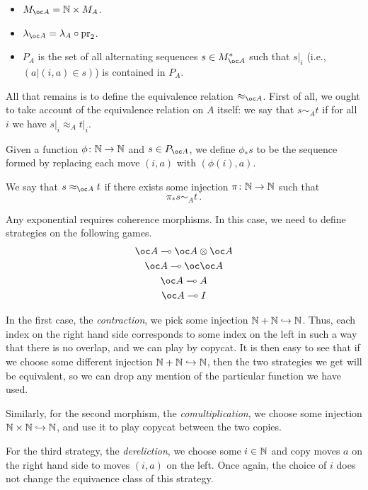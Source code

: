 \documentclass{article}
\begin{document}
\begin{itemize}
  \item $M_{\oc A} = \bN \times M_A$.
  \item $\lambda_{\oc A} = \lambda_A \circ \pr_2$.
  \item $P_A$ is the set of all alternating sequences $s\in M_{\oc A}^*$ such that $s\vert_i$ (i.e., $(a\vert (i,a)\in s)$) is contained in $P_A$.
\end{itemize}

All that remains is to define the equivalence relation $\approx_{\oc A}$.  
First of all, we ought to take account of the equivalence relation on $A$ itself: we say that $s\sim_At$ if for all $i$ we have $s\vert_i\approx_A t\vert_i$.

Given a function $\phi\colon \mathbb{N} \to \mathbb{N}$ and $s\in P_{\oc A}$, we define $\phi_*s$ to be the sequence formed by replacing each move $(i,a)$ with $(\phi(i),a)$.

We say that $s\approx_{\oc A}t$ if there exists some injection $\pi\colon \mathbb{N}\to\mathbb{N}$ such that
\[
  \pi_*s\sim_At\,.
  \]

Any exponential requires coherence morphisms.  
In this case, we need to define strategies on the following games.
\begin{gather*}
  \oc A \implies \oc A \tensor \oc A \\
  \oc A \implies \oc \oc A \\
  \oc A \implies A \\
  \oc A \implies I \\
\end{gather*}

In the first case, the \emph{contraction}, we pick some injection $\mathbb{N} + \mathbb{N} \hookrightarrow \mathbb{N}$. 
Thus, each index on the right hand side corresponds to some index on the left in such a way that there is no overlap, and we can play by copycat.
It is then easy to see that if we choose some different injection $\mathbb{N} + \mathbb{N} \hookrightarrow \mathbb{N}$, then the two strategies we get will be equivalent, so we can drop any mention of the particular function we have used.

Similarly, for the second morphism, the \emph{comultiplication}, we choose some injection $\mathbb{N} \times \mathbb{N} \hookrightarrow \mathbb{N}$, and use it to play copycat between the two copies.

For the third strategy, the \emph{dereliction}, we choose some $i\in \mathbb{N}$ and copy moves $a$ on the right hand side to moves $(i,a)$ on the left.  
Once again, the choice of $i$ does not change the equivaence class of this strategy.
\end{document}
